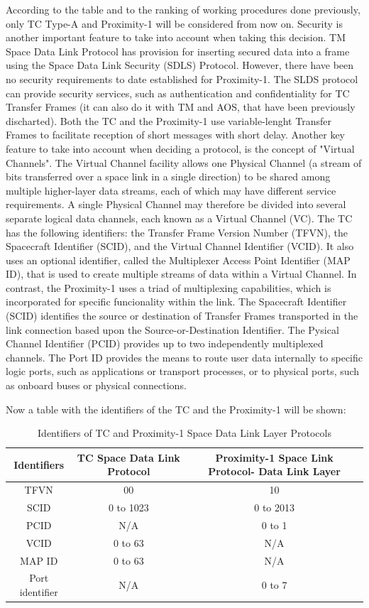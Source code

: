 According to the table and to the ranking of working procedures done previously, only TC Type-A and Proximity-1 will be considered from now on. Security is another important feature to take into account when taking this decision. TM Space Data Link Protocol has provision for inserting secured data into a frame using the Space Data Link Security (SDLS) Protocol. However, there have been no security requirements to date established for Proximity-1. The SLDS protocol can provide security services, such as authentication and confidentiality for TC Transfer Frames (it can also do it with TM and AOS, that have been previously discharted). Both the TC and the Proximity-1 use variable-lenght Transfer Frames to facilitate reception of short messages with short delay. Another key feature to take into account when deciding a protocol, is the concept of "Virtual Channels". The Virtual Channel facility allows one Physical Channel (a stream of bits transferred over a space link in a single direction) to be shared among multiple higher-layer data streams, each of which may have different service requirements. A single Physical Channel may therefore be divided into several separate logical data channels, each known as a Virtual Channel (VC). The TC has the following identifiers: the Transfer Frame Version Number (TFVN), the Spacecraft Identifier (SCID), and the Virtual Channel Identifier (VCID). It also uses an optional identifier, called the Multiplexer Access Point Identifier (MAP ID), that is used to create multiple streams of data within a Virtual Channel. In contrast, the Proximity-1 uses a triad of multiplexing capabilities, which is incorporated for specific funcionality within the link. The Spacecraft Identifier (SCID) identifies the source or destination of Transfer Frames transported in the link connection based upon the Source-or-Destination Identifier. The Pysical Channel Identifier (PCID) provides up to two independently multiplexed channels. The Port ID provides the means to route user data internally to specific logic ports, such as applications or transport processes, or to physical ports, such as onboard buses or physical connections.

Now a table with the identifiers of the TC and the Proximity-1 will be shown:

\begin{table}[H]
\begin{center}
\begin{tabular}{|c|c|c|}
\hline
Identifiers&TC Space Data Link Protocol&Proximity-1 Space Link Protocol- Data Link Layer\\
\hline
TFVN&00&10\\
\hline
SCID&0 to 1023&0 to 2013\\
\hline
PCID&N/A&0 to 1\\
\hline
VCID&0 to 63&N/A\\
\hline
MAP ID&0 to 63&N/A\\
\hline
Port identifier&N/A&0 to 7\\
\hline
\end{tabular}
\caption{Identifiers of TC and Proximity-1 Space Data Link Layer Protocols}
\end{center}
\end{table}

